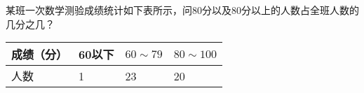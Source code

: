 
某班一次数学测验成绩统计如下表所示，问80分以及80分以上的人数占全班人数的几分之几？\\
\begin{tabular}{|l|l|l|l|}
	\hline
	成绩（分） & 60以下 & $60 \sim 79$ &  $80 \sim 100$ \\ \hline
	人数 & 1 & 23 & 20 \\ \hline
\end{tabular}
